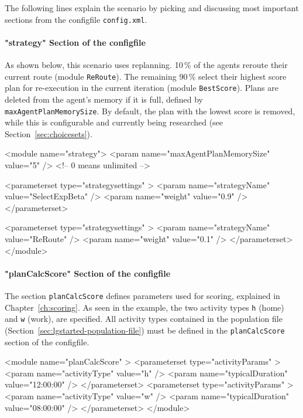 The following lines explain the scenario by picking and discussing most important sections from the \gls{configfile} \lstinline|config.xml|.


\paragraph{"strategy" Section of the \protect\gls{configfile}}

As shown below, this scenario uses replanning. 10\,\% of the agents reroute their current route (module \lstinline|ReRoute|). The remaining 90\,\% select their highest score plan for re-execution in the current iteration (module \lstinline|BestScore|). Plans are deleted from the agent's memory if it is full, defined by \lstinline|maxAgentPlanMemorySize|. By default, the plan with the lowest score is removed, while this is configurable and currently being
researched (see Section~\ref{sec:choicesets}).
%
\begin{xml}
<module name="strategy">
   <param name="maxAgentPlanMemorySize" value="5" /> <!-- 0 means unlimited -->

   <parameterset type="strategysettings" >
      <param name="strategyName" value="SelectExpBeta" />
      <param name="weight" value="0.9" />
   </parameterset>

   <parameterset type="strategysettings" >
      <param name="strategyName" value="ReRoute" />
      <param name="weight" value="0.1" />
   </parameterset>
</module>
\end{xml}



\paragraph{"planCalcScore" Section of the \protect\gls{configfile}}

The section \lstinline|planCalcScore| defines parameters used for scoring, explained in Chapter~\ref{ch:scoring}. As seen in the example, the two activity types \lstinline|h| (home) and \lstinline|w| (work), are specified.  All activity types contained in the population file (\cf Section~\ref{sec:lgstarted-population-file}) must be defined in the \lstinline{planCalcScore} section of the \gls{configfile}.
\begin{xml}
<module name="planCalcScore" >
   <parameterset type="activityParams" >
      <param name="activityType" value="h" />
      <param name="typicalDuration" value="12:00:00" />
   </parameterset>
   <parameterset type="activityParams" >
      <param name="activityType" value="w" />
      <param name="typicalDuration" value="08:00:00" />
   </parameterset>
</module>
\end{xml}

